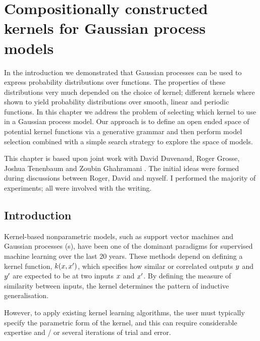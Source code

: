 
\inbpdocument

\chapter{Compositionally constructed kernels for Gaussian process models}
\label{ch:construction}

In the introduction we demonstrated that Gaussian processes can be used to express probability distributions over functions.
The properties of these distributions very much depended on the choice of kernel; different kernels where shown to yield probability distributions over smooth, linear and periodic functions.
In this chapter we address the problem of selecting which kernel to use in a Gaussian process model.
Our approach is to define an open ended space of potential kernel functions via a generative grammar and then perform model selection combined with a simple search strategy to explore the space of models.

This chapter is based upon joint work with David Duvenaud, Roger Grosse, Joshua Tenenbaum and Zoubin Ghahramani \citep{Duvenaud2013-dn}.
The initial ideas were formed during discussions between Roger, David and myself.
I performed the majority of experiments; all were involved with the writing.

\section{Introduction}

Kernel-based nonparametric models, such as support vector machines and Gaussian processes (\gp{}s), have been one of the dominant paradigms for supervised machine learning over the last 20 years.
These methods depend on defining a kernel function, $k(x,x')$, which specifies how similar or correlated outputs $y$ and $y'$ are expected to be at two inputs $x$ and $x'$.
By defining the measure of similarity between inputs, the kernel determines the pattern of inductive generalisation.


However, to apply existing kernel learning algorithms, the user must typically specify the parametric form of the kernel, and this can require considerable expertise and / or several iterations of trial and error.


